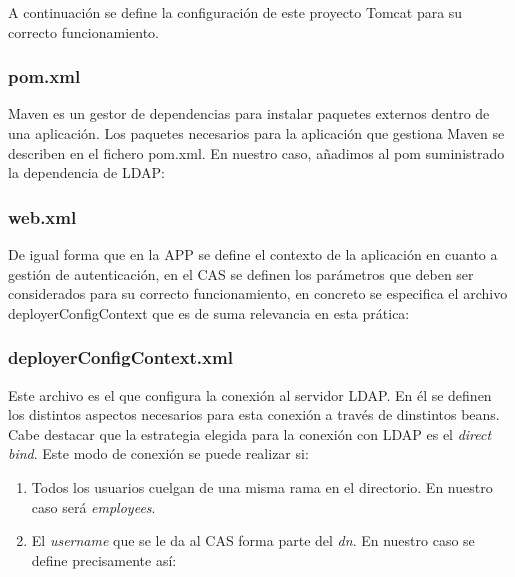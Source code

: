 \documentclass[10pt,a4paper]{article}
\begin{document}
A continuación se define la configuración de este proyecto Tomcat para su correcto funcionamiento.

\subsubsection*{pom.xml}
Maven es un gestor de dependencias para instalar paquetes externos dentro de una aplicación. Los paquetes necesarios para la aplicación que gestiona Maven se describen en el fichero pom.xml. En nuestro caso, añadimos al pom suministrado la dependencia de LDAP:


\subsubsection*{web.xml}
De igual forma que en la APP se define el contexto de la aplicación en cuanto a gestión de autenticación, en el CAS se definen los parámetros que deben ser considerados para su correcto funcionamiento, en concreto se especifica el archivo deployerConfigContext que es de suma relevancia en esta prática:


\subsubsection*{deployerConfigContext.xml}
Este archivo es el que configura la conexión al servidor LDAP. En él se definen los distintos aspectos necesarios para esta conexión a través de dinstintos beans.\\

Cabe destacar que la estrategia elegida para la conexión con LDAP es el \textit{direct bind}. Este modo de conexión se puede realizar si:
\begin{enumerate}
\item Todos los usuarios cuelgan de una misma rama en el directorio. En nuestro caso será \textit{employees}.
\item El \textit{username} que se le da al CAS forma parte del \textit{dn}. En nuestro caso se define precisamente así:\\
\end{enumerate}
\end{document}
